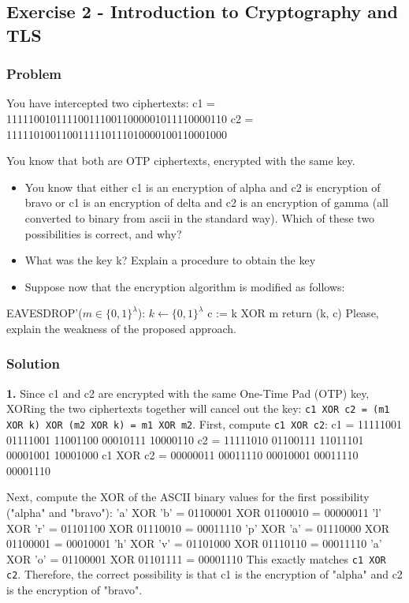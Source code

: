 \documentclass{article}
\begin{document}
\subsection{Exercise 2 - Introduction to Cryptography and TLS}
\subsubsection*{Problem}
You have intercepted two ciphertexts:
c1 = 1111100101111001110011000001011110000110
c2 = 1111101001100111110111010000100110001000

You know that both are OTP ciphertexts, encrypted with the same key.

\begin{itemize}
    \item[\textbf{1.}] [2 points] You know that either c1 is an encryption of alpha and c2 is encryption of bravo or c1 is an encryption of delta and c2 is an encryption of gamma (all converted to binary from ascii in the standard way). Which of these two possibilities is correct, and why?
    \item[\textbf{2.}] [1 point] What was the key k? Explain a procedure to obtain the key
    \item[\textbf{3.}] [2 points] Suppose now that the encryption algorithm is modified as follows:
\end{itemize}
EAVESDROP'($m \in \{0, 1\}^\lambda$):
$k \gets \{0, 1\}^\lambda$
c := k XOR m
return (k, c)
Please, explain the weakness of the proposed approach.

\subsubsection*{Solution}
\textbf{1.} Since c1 and c2 are encrypted with the same One-Time Pad (OTP) key, XORing the two ciphertexts together will cancel out the key: \texttt{c1 XOR c2 = (m1 XOR k) XOR (m2 XOR k) = m1 XOR m2}.
First, compute \texttt{c1 XOR c2}:
c1 = 11111001 01111001 11001100 00010111 10000110
c2 = 11111010 01100111 11011101 00001001 10001000
c1 XOR c2 = 00000011 00011110 00010001 00011110 00001110

Next, compute the XOR of the ASCII binary values for the first possibility ("alpha" and "bravo"):
'a' XOR 'b' = 01100001 XOR 01100010 = 00000011
'l' XOR 'r' = 01101100 XOR 01110010 = 00011110
'p' XOR 'a' = 01110000 XOR 01100001 = 00010001
'h' XOR 'v' = 01101000 XOR 01110110 = 00011110
'a' XOR 'o' = 01100001 XOR 01101111 = 00001110
This exactly matches \texttt{c1 XOR c2}. Therefore, the correct possibility is that c1 is the encryption of "alpha" and c2 is the encryption of "bravo".
\end{document}
